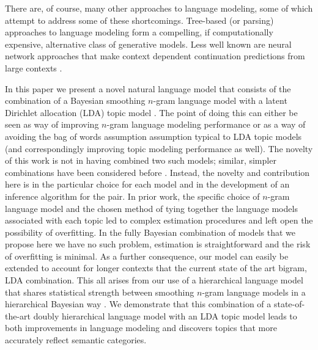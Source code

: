 
There are, of course, many other approaches to language modeling, some of which attempt to address some of these shortcomings.  Tree-based (or parsing) approaches \cite{Roark2001,Collins2003,Johnson2007,Liang2007} to language modeling form a compelling, if computationally expensive, alternative class of generative models.   %
Less well known are neural network approaches that make context dependent continuation predictions from large contexts \cite{Mnih2007,Mnih2009}.



In this paper we present a novel natural language model that consists of the combination of a Bayesian smoothing $n$-gram language model with a latent Dirichlet allocation (LDA) topic model \cite{Blei2003a}.  The point of doing this can either be seen as way of improving $n$-gram language modeling performance or as a way of avoiding the bag of words assumption assumption typical to LDA topic models (and correspondingly improving topic modeling performance as well).  The novelty of this work is not in having combined two such models; similar, simpler combinations have been considered before \cite{Wallach2006}.  Instead, the novelty and contribution here is in the particular choice for each model and in the development of an inference algorithm for the pair.  In prior work, the specific choice of  $n$-gram language model and the chosen method of tying together the language models associated with each topic led to complex estimation procedures and left open the possibility of overfitting.  In the fully Bayesian combination of models that we propose here we have no such problem, estimation is straightforward and the risk of overfitting is minimal.  As a further consequence, our model can easily be extended to account for longer contexts that the current state of the art bigram, LDA combination.  This all arises from our use of a hierarchical language model that shares statistical strength between smoothing $n$-gram language models in a hierarchical Bayesian way \cite{Wood2009}.   We demonstrate that this combination of a state-of-the-art doubly hierarchical language model with an LDA topic model leads to both improvements in language modeling and discovers topics that more accurately reflect semantic categories.

